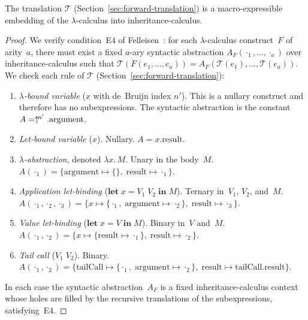\begin{theorem}
  \label{thm:forward-macro}
  The translation $\mathcal{T}$
  (Section~\ref{sec:forward-translation}) is a macro-expressible
  embedding of the $\lambda$-calculus into inheritance-calculus.
\end{theorem}

\begin{proof}
  We verify condition~E4 of
  Felleisen~\cite[Definition~3.11]{felleisen1991-expressive-power}:
  for each $\lambda$-calculus construct~$F$ of arity~$a$,
  there must exist a fixed $a$-ary syntactic abstraction
  $A_F(\cdot_1,\ldots,\cdot_a)$ over
  inheritance-calculus such that
  $\mathcal{T}(F(e_1,\ldots,e_a)) =
  A_F(\mathcal{T}(e_1),\ldots,\mathcal{T}(e_a))$.
  We check each rule of $\mathcal{T}$
  (Section~\ref{sec:forward-translation}):
  \begin{enumerate}
    \item \emph{$\lambda$-bound variable}
      ($x$ with de~Bruijn index $n'$).
      This is a nullary construct and therefore has no subexpressions.
      The syntactic abstraction is the constant
      $A = \uparrow^{\!n'}.\mathrm{argument}$.
    \item \emph{Let-bound variable} ($x$).
      Nullary.
      $A = x.\mathrm{result}$.
    \item \emph{$\lambda$-abstraction}, denoted $\lambda x.\, M$.
      Unary in the body~$M$.
      $A(\cdot_1) = \{\mathrm{argument} \mapsto \{\},\;
      \mathrm{result} \mapsto \cdot_1\}$.
    \item \emph{Application let-binding}
      ($\mathbf{let}\; x = V_1\; V_2
      \;\mathbf{in}\; M$).
      Ternary in~$V_1$, $V_2$, and~$M$.
      $A(\cdot_1, \cdot_2, \cdot_3) =
      \{x \mapsto \{\cdot_1,\;
        \mathrm{argument} \mapsto \cdot_2\},\;
      \mathrm{result} \mapsto \cdot_3\}$.
    \item \emph{Value let-binding}
      ($\mathbf{let}\; x = V \;\mathbf{in}\; M$).
      Binary in~$V$ and~$M$.
      $A(\cdot_1, \cdot_2) =
      \{x \mapsto \{\mathrm{result} \mapsto \cdot_1\},\;
      \mathrm{result} \mapsto \cdot_2\}$.
    \item \emph{Tail call} ($V_1\; V_2$).
      Binary.\newline
      $A(\cdot_1, \cdot_2) =
      \{\mathrm{tailCall} \mapsto
        \{\cdot_1,\;
        \mathrm{argument} \mapsto \cdot_2\},\;
        \mathrm{result} \mapsto
      \mathrm{tailCall}.\mathrm{result}\}$.
  \end{enumerate}
  In each case the syntactic abstraction~$A_F$ is a fixed
  inheritance-calculus context whose holes are filled
  by the recursive translations of the subexpressions,
  satisfying~E4.
\end{proof}

